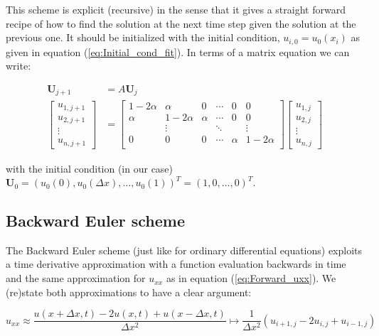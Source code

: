 \documentclass[a4paper, 11pt, notitlepage,english]{article}
\begin{document}
This scheme is explicit (recursive) in the sense that it gives a straight forward recipe of how to find the solution at the next time step given the solution at the previous one. It should be initialized with the initial condition, $u_{i,0} = u_0(x_i)$ as given in equation (\ref{eq:Initial_cond_fit}). In terms of a matrix equation we can write:

\begin{align}
\boldsymbol{U}_{j+1} &= A \boldsymbol{U}_j \\
\begin{bmatrix}
u_{1,j+1} \\ u_{2,j+1} \\ \vdots \\ u_{n,j+1}
\end{bmatrix}
&=
\begin{bmatrix}
 1-2\alpha & \alpha & 0 & \cdots & 0 & 0 \\
 \alpha & 1-2\alpha & \alpha & \cdots & 0 & 0 \\
  & \vdots & & \ddots & & \vdots \\
 0 & 0 & 0 & \cdots & \alpha & 1-2\alpha \\
\end{bmatrix}
\begin{bmatrix}
u_{1,j} \\ u_{2,j} \\ \vdots \\ u_{n,j}
\end{bmatrix}
\label{eq:Forward_Euler_matrix}
\end{align}

with the initial condition (in our case) $\boldsymbol{U}_0 = (u_0(0), u_0(\Delta x), \dots, u_0(1))^T = (1,0,\dots,0)^T$.

\subsection{Backward Euler scheme}
The Backward Euler scheme (just like for ordinary differential equations) exploits a time derivative approximation with a function evaluation backwards in time and the same approximation for $u_{xx}$ as in equation (\ref{eq:Forward_uxx}). We (re)state both approximations to have a clear argument:

\begin{equation}
u_{xx} \approx \frac{u(x+\Delta x,t)-2u(x,t)+u(x-\Delta x, t)}{\Delta x^2} \mapsto \frac{1}{\Delta x^2} (u_{i+1,j}-2u_{i,j}+u_{i-1,j})
\label{eq:Backward_uxx}
\end{equation}
\end{document}
